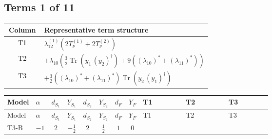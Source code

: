 \documentclass[8pt]{article}
\begin{document}
\begin{landscape}
\subsection*{Terms 1 of 11}
\begin{center}
\begin{tabular}{@{}c >{\raggedright\arraybackslash}p{0.82\linewidth}@{}}
\toprule
Column & Representative term structure \\
\midrule
T1 & \(\displaystyle {\lambda_{12}^{(1)}} (2 T_{\nu}^{(1)}+2 T_{\nu}^{(2)})\) \\
\midrule
T2 & \(\displaystyle +{\lambda_{10}} \left(\frac{3}{2} \operatorname{Tr}\!\left({y_1}\,\left({y_2}\right)^{\dagger}\right)+9 (\left({\lambda_{10}}\right)^{*}+\left({\lambda_{11}}\right)^{*})\right)\) \\
\midrule
T3 & \(\displaystyle +\frac{3}{2} (\left({\lambda_{10}}\right)^{*}+\left({\lambda_{11}}\right)^{*}) \operatorname{Tr}\!\left({y_2}\,\left({y_1}\right)^{\dagger}\right)\) \\
\midrule
\bottomrule
\end{tabular}
\end{center}
\smallskip
\tiny
\begin{longtable}{@{}llcccccc >{\raggedright\arraybackslash}p{0.21\linewidth} >{\raggedright\arraybackslash}p{0.21\linewidth} >{\raggedright\arraybackslash}p{0.21\linewidth}@{}}
\toprule
Model & $\alpha$ & $d_{S_1}$ & $Y_{S_1}$ & $d_{S_2}$ & $Y_{S_2}$ & $d_F$ & $Y_F$ & T1 & T2 & T3 \\
\midrule
\endfirsthead
\toprule
Model & $\alpha$ & $d_{S_1}$ & $Y_{S_1}$ & $d_{S_2}$ & $Y_{S_2}$ & $d_F$ & $Y_F$ & T1 & T2 & T3 \\
\midrule
\endhead
T3-B & $-1$ & $2$ & $-\frac{1}{2}$ & $2$ & $\frac{1}{2}$ & $1$ & $0$ & \scriptsize\adjustbox{max width=\linewidth}{$\begin{gathered} {\lambda_{12}^{(1)}} (2 T_{\nu}^{(1)}+2 T_{\nu}^{(2)})\end{gathered}$} & \scriptsize\adjustbox{max width=\linewidth}{$\begin{gathered} +{\lambda_{10}} \left(\frac{3}{2} \operatorname{Tr}\!\left({y_1}\,\left({y_2}\right)^{\dagger}\right)+9 (\left({\lambda_{10}}\right)^{*}+\left({\lambda_{11}}\right)^{*})\right) \\ +{\lambda_{11}} \left(\frac{3}{2} \operatorname{Tr}\!\left({y_1}\,\left({y_2}\right)^{\dagger}\right)+9 (\left({\lambda_{10}}\right)^{*}+\left({\lambda_{11}}\right)^{*})\right)\end{gathered}$} & \scriptsize\adjustbox{max width=\linewidth}{$\begin{gathered} +\frac{3}{2} (\left({\lambda_{10}}\right)^{*}+\left({\lambda_{11}}\right)^{*}) \operatorname{Tr}\!\left({y_2}\,\left({y_1}\right)^{\dagger}\right)\end{gathered}$} \\

\end{longtable}
\end{landscape}
\end{document}
